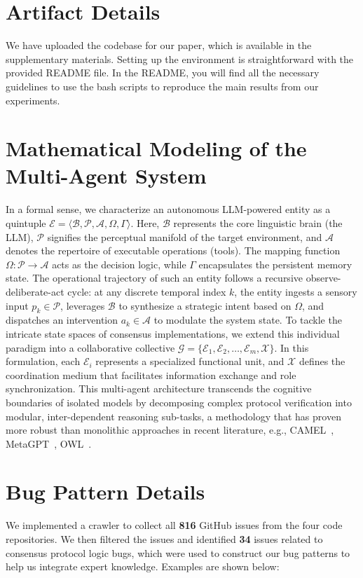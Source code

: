 \documentclass{article}
\theoremstyle{plain}
\theoremstyle{definition}
\theoremstyle{remark}
\begin{document}
\section{Artifact Details}
\label{appendsec:artifact}
We have uploaded the codebase for our paper, which is available in the supplementary materials. Setting up the environment is straightforward with the provided README file. In the README, you will find all the necessary guidelines to use the bash scripts to reproduce the main results from our experiments.

\section{Mathematical Modeling of the Multi-Agent System}
\label{appendsec:multiagent}
In a formal sense, we characterize an autonomous LLM-powered entity as a quintuple $\mathcal{E} = \langle \mathcal{B}, \mathcal{P}, \mathcal{A}, \Omega, \Gamma \rangle$. Here, $\mathcal{B}$ represents the core linguistic brain (the LLM), $\mathcal{P}$ signifies the perceptual manifold of the target environment, and $\mathcal{A}$ denotes the repertoire of executable operations (tools). The mapping function $\Omega: \mathcal{P} \to \mathcal{A}$ acts as the decision logic, while $\Gamma$ encapsulates the persistent memory state. The operational trajectory of such an entity follows a recursive observe-deliberate-act cycle: at any discrete temporal index $k$, the entity ingests a sensory input $p_k \in \mathcal{P}$, leverages $\mathcal{B}$ to synthesize a strategic intent based on $\Omega$, and dispatches an intervention $a_k \in \mathcal{A}$ to modulate the system state. To tackle the intricate state spaces of consensus implementations, we extend this individual paradigm into a collaborative collective $\mathcal{G} = \{ \mathcal{E}_1, \mathcal{E}_2, \dots, \mathcal{E}_m, \mathcal{X} \}$. In this formulation, each $\mathcal{E}_i$ represents a specialized functional unit, and $\mathcal{X}$ defines the coordination medium that facilitates information exchange and role synchronization. This multi-agent architecture transcends the cognitive boundaries of isolated models by decomposing complex protocol verification into modular, inter-dependent reasoning sub-tasks, a methodology that has proven more robust than monolithic approaches in recent literature, e.g., CAMEL~\cite{Li2023CAMELCA}, MetaGPT~\cite{hong2023metagpt}, OWL~\cite{Hu2025OWLOW}.


\section{Bug Pattern Details}
\label{appendsec:bugpattern}
We implemented a crawler to collect all \textbf{816} GitHub issues from the four code repositories. We then filtered the issues and identified \textbf{34} issues related to consensus protocol logic bugs, which were used to construct our bug patterns to help us integrate expert knowledge. Examples are shown below:
\end{document}
